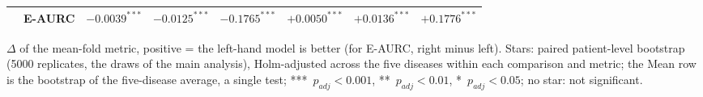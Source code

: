 \begin{table}[htbp]
\begin{threeparttable}
\begin{tabular}{ll|rrr|rrr}
 & E-AURC & $-0.0039^{***}$ & $-0.0125^{***}$ & $-0.1765^{***}$ & $+0.0050^{***}$ & $+0.0136^{***}$ & $+0.1776^{***}$ \\
\bottomrule
\end{tabular}
\begin{tablenotes}\footnotesize
\item $\Delta$ of the mean-fold metric, positive = the left-hand model is better (for E-AURC, right minus left). Stars: paired patient-level bootstrap (5000 replicates, the draws of the main analysis), Holm-adjusted across the five diseases within each comparison and metric; the Mean row is the bootstrap of the five-disease average, a single test; ***~$p_{adj} < 0.001$, **~$p_{adj} < 0.01$, *~$p_{adj} < 0.05$; no star: not significant.
\end{tablenotes}
\end{threeparttable}
\end{table}
